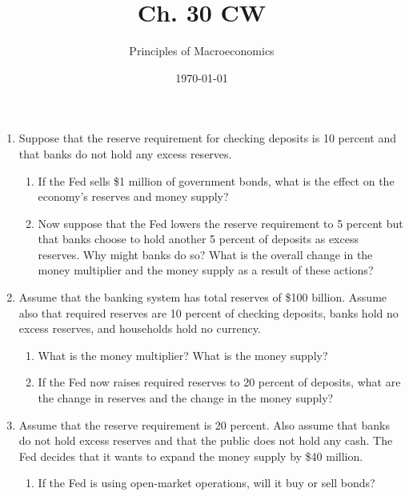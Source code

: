 \documentclass{article}
\title{Ch. 30 CW}
\author{Principles of Macroeconomics}
\date{\today}
\begin{document}
\maketitle

\begin{enumerate}

\item Suppose that the reserve requirement for checking deposits is 10 percent and that banks do not hold any excess reserves.

	\begin{enumerate}
	
	\item If the Fed sells \$1 million of government bonds, what is the effect on the economy's reserves and money supply?
	
	\item Now suppose that the Fed lowers the reserve requirement to 5 percent but that banks choose to hold another 5 percent of deposits as excess reserves. Why might banks do so? What is the overall change in the money multiplier and the money supply as a result of these actions? 
	
	\end{enumerate}
	
\item Assume that the banking system has total reserves of \$100 billion. Assume also that required reserves are 10 percent of checking deposits, banks hold no excess reserves, and households hold no currency.

	\begin{enumerate}
	
	\item What is the money multiplier? What is the money supply?
	
	\item If the Fed now raises required reserves to 20 percent of deposits, what are the change in reserves and the change in the money supply? 
	
	\end{enumerate}
	
\item Assume that the reserve requirement is 20 percent. Also assume that banks do not hold excess reserves and that the public does not hold any cash. The Fed decides that it wants to expand the money supply by \$40 million.

	\begin{enumerate}
	
	\item If the Fed is using open-market operations, will it buy or sell bonds?
	

\end{enumerate}
\end{enumerate}
\end{document}
